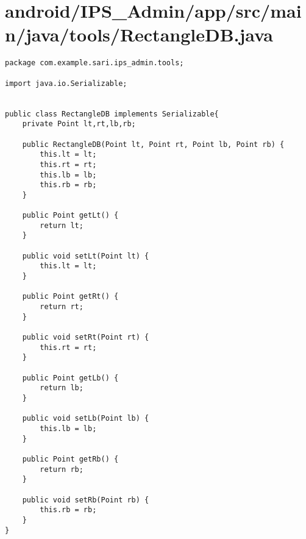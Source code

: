 \section{android/IPS\_Admin/app/src/main/java/tools/RectangleDB.java}
\begin{lstlisting}package com.example.sari.ips_admin.tools;

import java.io.Serializable;


public class RectangleDB implements Serializable{
    private Point lt,rt,lb,rb;

    public RectangleDB(Point lt, Point rt, Point lb, Point rb) {
        this.lt = lt;
        this.rt = rt;
        this.lb = lb;
        this.rb = rb;
    }

    public Point getLt() {
        return lt;
    }

    public void setLt(Point lt) {
        this.lt = lt;
    }

    public Point getRt() {
        return rt;
    }

    public void setRt(Point rt) {
        this.rt = rt;
    }

    public Point getLb() {
        return lb;
    }

    public void setLb(Point lb) {
        this.lb = lb;
    }

    public Point getRb() {
        return rb;
    }

    public void setRb(Point rb) {
        this.rb = rb;
    }
}
\end{lstlisting}
\newpage

